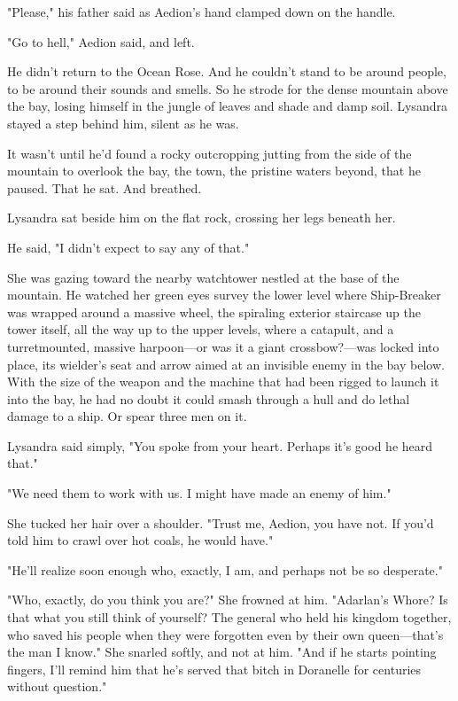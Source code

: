 "Please," his father said as Aedion's hand clamped down on the handle.

"Go to hell," Aedion said, and left.

He didn't return to the Ocean Rose.
And he couldn't stand to be around people, to be around their sounds and smells.
So he strode for the dense mountain above the bay, losing himself in the jungle of leaves and shade and damp soil.
Lysandra stayed a step behind him, silent as he was.

It wasn't until he'd found a rocky outcropping jutting from the side of the mountain to overlook the bay, the town, the pristine waters beyond, that he paused.
That he sat.
And breathed.

Lysandra sat beside him on the flat rock, crossing her legs beneath her.

He said, "I didn't expect to say any of that."

She was gazing toward the nearby watchtower nestled at the base of the mountain.
He watched her green eyes survey the lower level where Ship-Breaker was wrapped around a massive wheel, the spiraling exterior staircase up the tower itself, all the way up to the upper levels, where a catapult, and a turretmounted, massive harpoon---or was it a giant crossbow?---was locked into place, its wielder's seat and arrow aimed at an invisible enemy in the bay below.
With the size of the weapon and the machine that had been rigged to launch it into the bay, he had no doubt it could smash through a hull and do lethal damage to a ship.
Or spear three men on it.

Lysandra said simply, "You spoke from your heart.
Perhaps it's good he heard that."

"We need them to work with us.
I might have made an enemy of him."

She tucked her hair over a shoulder.
"Trust me, Aedion, you have not.
If you'd told him to crawl over hot coals, he would have."

"He'll realize soon enough who, exactly, I am, and perhaps not be so desperate."

"Who, exactly, do you think you are?"
She frowned at him.
"Adarlan's Whore?
Is that what you still think of yourself?
The general who held his kingdom together, who saved his people when they were forgotten even by their own queen---that's the man I know."
She snarled softly, and not at him.
"And if he starts pointing fingers, I'll remind him that he's served that bitch in Doranelle for centuries without question."

